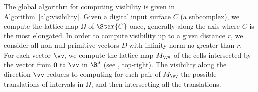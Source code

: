The global algorithm for computing visibility is given in
Algorithm~\ref{alg:visibility}. Given a digital input surface $C$ (a
subcomplex), we compute the lattice map $\Omega$ of $\Star{C}$ once,
generally along the axis where $C$ is the most elongated. In order to
compute visibility up to a given distance $r$, we consider all
non-null primitive vectors $D$ with infinity norm no greater than $r$.
For each vector $\vv$, we compute the lattice map $M_\vv$ of the cells
intersected by the vector from $\mathbf{0}$ to $\vv$ in $\R^d$
(see , top-right). The
visibility along the direction $\vv$ reduces to computing for each
pair of $M_\vv$ the possible translations of intervals in $\Omega$,
and then intersecting all the translations.







